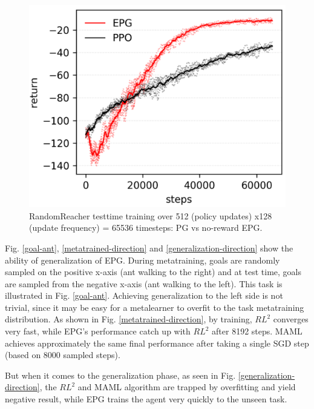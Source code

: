 \begin{figure}
	\includegraphics[scale=0.6]{reacher.png}
	\centering
	\caption{RandomReacher testtime training over 512 (policy updates) x128 (update frequency) = 65536 timesteps: PG vs no-reward EPG.}
	\label{reacher}
\end{figure}

\par
Fig. \ref{goal-ant}, \ref{metatrained-direction} and \ref{generalization-direction} show the ability of generalization of EPG. During metatraining, goals are randomly sampled on the positive x-axis (ant walking to the right) and at test time, goals are sampled from the negative x-axis (ant walking to the left). This task is illustrated in Fig. \ref{goal-ant}. Achieving generalization to the left side is not trivial, since it may be easy for a metalearner to overfit to the task metatraining distribution. As shown in Fig. \ref{metatrained-direction}, by training, $RL^2$ converges very fast, while EPG's performance catch up with $RL^2$ after 8192 steps. MAML achieves approximately the same final performance after taking a single SGD step (based on 8000 sampled steps).

\par
But when it comes to the generalization phase, as seen in Fig. \ref{generalization-direction}, the $RL^2$ and MAML algorithm are trapped by overfitting and yield negative result, while EPG trains the agent very quickly to the unseen task.

